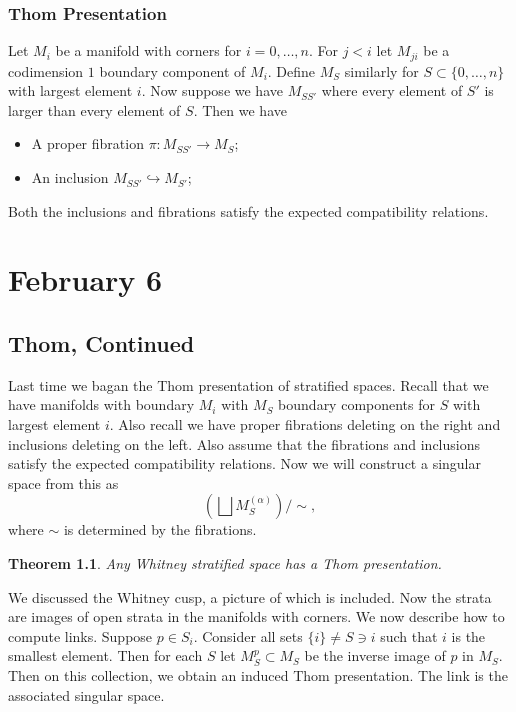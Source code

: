 \documentclass[leqno, openany]{memoir}
\newtheorem{thm}{Theorem}[chapter]
\theoremstyle{definition}
\theoremstyle{remark}
\theoremstyle{plain}
\theoremstyle{definition}
\theoremstyle{remark}
\begin{document}
\subsection{Thom Presentation}%

Let $M_i$ be a manifold with corners for $i = 0, \ldots, n$. For $j < i$ let
$M_{ji}$ be a codimension $1$ boundary component of $M_i$. Define $M_S$
similarly for $S \subset \{ 0, \ldots, n \}$ with largest element $i$. Now
suppose we have $M_{SS'}$ where every element of $S'$ is larger than every
element of $S$. Then we have \begin{itemize} \item A proper fibration $\pi:
M_{SS'} \to M_S$; \item An inclusion $M_{SS'} \hookrightarrow M_{S'}$;
\end{itemize} Both the inclusions and fibrations satisfy the expected
compatibility relations. 

\chapter{February 6}%

\section{Thom, Continued}%

Last time we bagan the Thom presentation of stratified spaces. Recall that we
have manifolds with boundary $M_i$ with $M_S$ boundary components for $S$ with
largest element $i$. Also recall we have proper fibrations deleting on the
right and inclusions deleting on the left. Also assume that the fibrations and
inclusions satisfy the expected compatibility relations. Now we will construct
a singular space from this as \[ \left( \bigsqcup M_S^{(\alpha)} \right) \big/
\sim, \] where $\sim$ is determined by the fibrations.

\begin{thm} Any Whitney stratified space has a Thom presentation.  \end{thm} We
discussed the Whitney cusp, a picture of which is included. Now the strata are
images of open strata in the manifolds with corners. We now describe how to
compute links. Suppose $p \in S_i$. Consider all sets $\{i \} \neq S \ni i$
such that $i$ is the smallest element. Then for each $S$ let $M_S^p \subset
M_S$ be the inverse image of $p$ in $M_S$. Then on this collection, we obtain
an induced Thom presentation. The link is the associated singular space.
\end{document}
